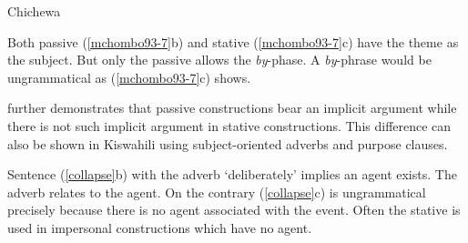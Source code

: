 \documentclass[output=paper]{langscibook}
\begin{document}
\begin{exe}
\ex Chichewa \citep[7]{Mchombo:1993aa} \label{mchombo93-7}
\begin{xlist}
\end{xlist}
\end{exe}

Both passive (\ref{mchombo93-7}b) and stative (\ref{mchombo93-7}c) have the theme as the subject. But only the passive allows the \textit{by}-phase. A \textit{by}-phrase would be ungrammatical as (\ref{mchombo93-7}c) shows. 

\citet{Mchombo:1993aa} further demonstrates that passive constructions bear an implicit argument while there is not such implicit argument in stative constructions. This difference can also be shown in Kiswahili using subject-oriented adverbs and purpose clauses.  

\begin{exe}
\ex\label{collapse}
\begin{xlist}
\end{xlist}
\end{exe}
Sentence (\ref{collapse}b) with the adverb `deliberately' implies an agent exists. The adverb relates to the agent. On the contrary (\ref{collapse}c) is ungrammatical precisely because there is no agent associated with the event. Often the stative is used in impersonal constructions which have no agent.  
\end{document}
